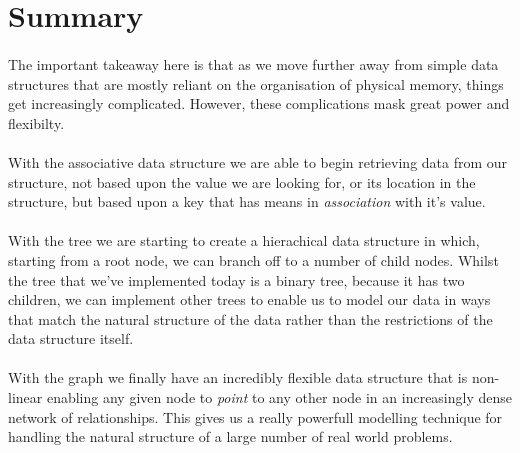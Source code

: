 \documentclass[10pt, a4paper, twosize]{article}
\begin{document}
\section{Summary}
\paragraph{} The important takeaway here is that as we move further away from simple data structures that are mostly reliant on the organisation of physical memory, things get increasingly complicated. However, these complications mask great power and flexibilty.

\paragraph{} With the associative data structure we are able to begin retrieving data from our structure, not based upon the value we are looking for, or its location in the structure, but based upon a key that has means in \emph{association} with it's value.

\paragraph{} With the tree we are starting to create a hierachical data structure in which, starting from a root node, we can branch off to a number of child nodes. Whilst the tree that we've implemented today is a binary tree, because it has two children, we can implement other trees to enable us to model our data in ways that match the natural structure of the data rather than the restrictions of the data structure itself.

\paragraph{} With the graph we finally have an incredibly flexible data structure that is non-linear enabling any given node to \emph{point} to any other node in an increasingly dense network of relationships. This gives us a really powerfull modelling technique for handling the natural structure of a large number of real world problems.



\end{document}
